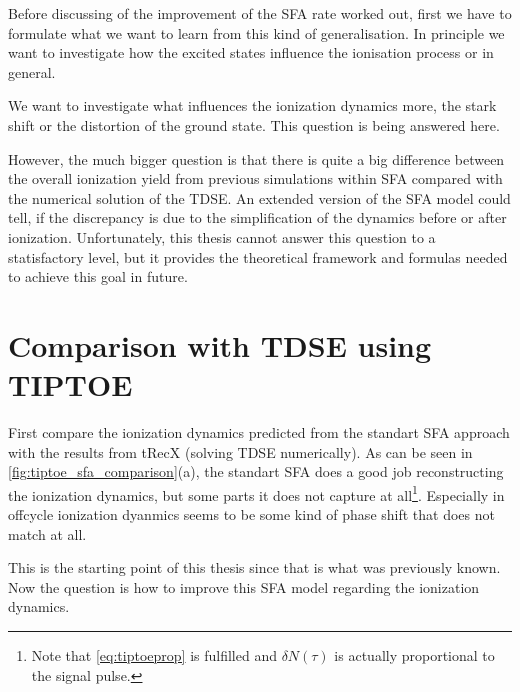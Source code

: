 Before discussing of the improvement of the SFA rate worked out, first we have to formulate what we want to learn from this kind of generalisation. 
In principle we want to investigate how the excited states influence the ionisation process or in general.

We want to investigate what influences the ionization dynamics more, the stark shift or the distortion of the ground state.
This question is being answered here.

However, the much bigger question is that there is quite a big difference between the overall ionization yield from previous simulations within SFA compared with the numerical solution of the TDSE.
An extended version of the SFA model could tell, if the discrepancy is due to the simplification of the dynamics before or after ionization.
Unfortunately, this thesis cannot answer this question to a statisfactory level, but it provides the theoretical framework and formulas needed to achieve this goal in future.





\section{Comparison with TDSE using TIPTOE}
First compare the ionization dynamics predicted from the standart SFA approach \cite{Theory_NPS} with the results from tRecX (solving TDSE numerically).
As can be seen in \ref{fig:tiptoe_sfa_comparison}(a), the standart SFA does a good job reconstructing the ionization dynamics, but some parts it does not capture at all\footnote{Note that \eqref{eq:tiptoeprop} is fulfilled and $\delta N(\tau)$ is actually proportional to the signal pulse.}.
Especially in offcycle ionization dyanmics seems to be some kind of phase shift that does not match at all. 

This is the starting point of this thesis since that is what was previously known.
Now the question is how to improve this SFA model regarding the ionization dynamics.

